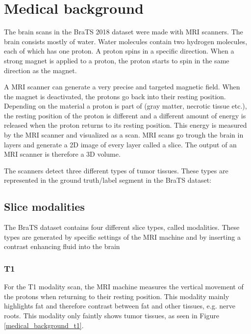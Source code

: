 \section{Medical background}
The brain scans in the BraTS\cite{menze2015multimodal} 2018 dataset were made with MRI scanners\cite{mriscanner}.
The brain consists mostly of water. Water molecules contain two hydrogen molecules, each of which has one proton. A proton spins in a specific direction. When a strong magnet is applied to a proton, the proton starts to spin in the same direction as the magnet. 

A MRI scanner can generate a very precise and targeted magnetic field. When the magnet is deactivated, the protons go back into their resting position. Depending on the material a proton is part of (gray matter, necrotic tissue etc.), the resting position of the proton is different and a different amount of energy is released when the proton returns to its resting position. This energy is measured by the MRI scanner and visualized as a scan. MRI scans go trough the brain in layers and generate a 2D image of every layer called a slice. The output of an MRI scanner is therefore a 3D volume.

The scanners detect three different types of tumor tissues. These types are represented in the ground truth/label segment in the BraTS dataset:

\subsection{Slice modalities}
The BraTS dataset contains four different slice types, called modalities. These types are generated by specific settings of the MRI machine and by inserting a contrast enhancing fluid into the brain

\subsubsection{T1}
For the T1 modality scan, the MRI machine measures the vertical movement of the protons when returning to their resting position. This modality mainly highlights fat and therefore contrast between fat and other tissues, e.g. nerve roots\cite{mriquora}. This modality only faintly shows tumor tissues, as seen in Figure \ref{medical_background_t1}.

